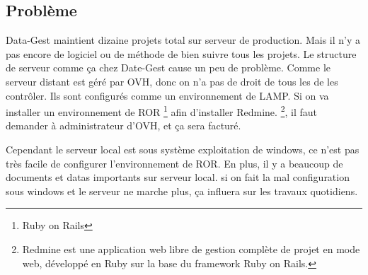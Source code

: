 \subsection{Problème}
Data-Gest maintient dizaine projets total sur serveur de production. Mais il n'y a pas encore de logiciel ou de méthode de bien suivre tous les projets.   
Le structure de serveur comme ça chez Date-Gest cause un peu de problème. Comme le serveur distant est géré par OVH, donc on n'a pas de droit de tous les de les contrôler. Ils sont configurés comme un environnement de LAMP. Si on va installer un environnement de ROR \footnote{Ruby on Rails} afin d'installer Redmine.  \footnote{Redmine est une application web libre de gestion complète de projet en mode web, développé en Ruby sur la base du framework Ruby on Rails.}, il faut demander à administrateur d'OVH, et ça sera facturé.

Cependant le serveur local est sous système exploitation de windows, ce n'est pas très facile de configurer l'environnement de ROR. En plus, il y a beaucoup de documents et datas importants sur serveur local. si on fait la mal configuration sous windows et le serveur ne marche plus, ça influera sur les travaux quotidiens.

 


